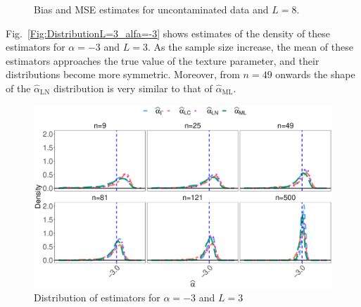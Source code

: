 \documentclass[twocolumn]{svjour3}
\begin{document}
\begin{figure}[hbt]
	\centering
	\caption{Bias and MSE estimates for uncontaminated data and $L=8$.}\label{SesgoyECMSinContL=8} 
\end{figure}


Fig.~\ref{Fig:DistributionL=3_alfa=-3} shows estimates of the density of these estimators for $\alpha=-3$ and $L=3$. 
As the sample size increase, the mean of these estimators approaches the true value of the texture parameter, and their distributions become more symmetric. 
Moreover, from $n=49$ onwards the shape of the $\widehat{\alpha}_{\text{{LN}}}$ distribution is very similar to that of $\widehat{\alpha}_{\text{{ML}}}$.

\begin{figure}[hbt]
	\centering
	\includegraphics[width=1\linewidth]{../../../Figures/PaperTesis/DensidadEstimadorNoCont.eps}
	\caption{\label{Fig:DistributionL=3_alfa=-3} Distribution of estimators for $\alpha=-3$ and  $L=3$ }\label{Fig:DistEstimator}
\end{figure}
\end{document}
